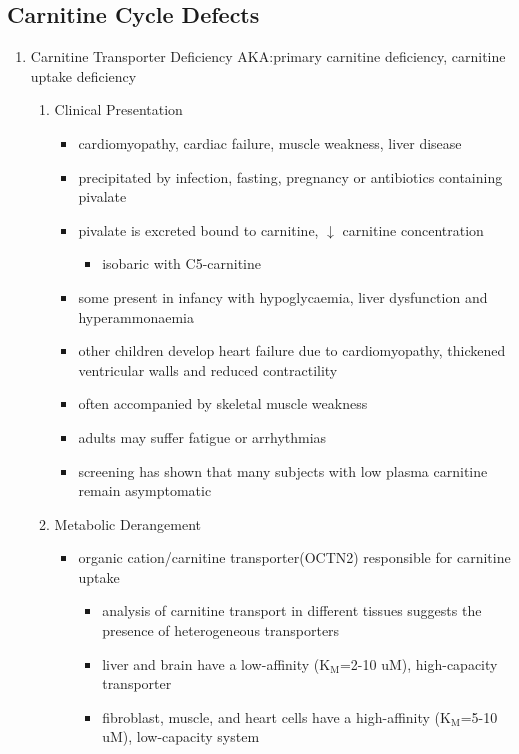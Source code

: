 \documentclass{scrartcl}
\begin{document}
\subsection{Carnitine Cycle Defects}
\label{sec:orga3c18c5}
\begin{enumerate}
\item Carnitine Transporter Deficiency
\label{sec:orgb4f3cd6}
AKA:primary carnitine deficiency, carnitine uptake deficiency
\begin{enumerate}
\item Clinical Presentation
\label{sec:org0b13a36}
\begin{itemize}
\item cardiomyopathy, cardiac failure, muscle weakness, liver disease
\item precipitated by infection, fasting, pregnancy or antibiotics containing pivalate
\item pivalate is excreted bound to carnitine, \(\downarrow\) carnitine concentration
\begin{itemize}
\item isobaric with C5-carnitine
\end{itemize}
\item some present in infancy with hypoglycaemia, liver dysfunction and hyperammonaemia
\item other children develop heart failure due to cardiomyopathy,
thickened ventricular walls and reduced contractility
\item often accompanied by skeletal muscle weakness
\item adults may suffer fatigue or arrhythmias
\item screening has shown that many subjects with low plasma carnitine remain asymptomatic
\end{itemize}
\item Metabolic Derangement
\label{sec:orgf8d2952}
\begin{itemize}
\item organic cation/carnitine transporter(OCTN2) responsible for
carnitine uptake
\begin{itemize}
\item analysis of carnitine transport in different tissues suggests the
presence of heterogeneous transporters
\item liver and brain have a low-affinity (K\(_{\text{M}}\)=2-10 uM), high-capacity transporter
\item fibroblast, muscle, and heart cells have a high-affinity (K\(_{\text{M}}\)=5-10 uM), low-capacity system

\end{itemize}
\end{itemize}
\end{enumerate}
\end{enumerate}
\end{document}
